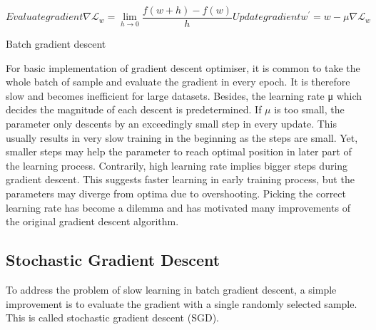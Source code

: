 \documentclass[11pt]{article} %
\theoremstyle{plain}
\theoremstyle{definition}
\begin{document}
\begin{appendices}
	\begin{subequations} 
		
		Evaluate gradient
		\begin{equation}
		\label{bgd1}
		\nabla\mathcal{L}_w=\lim\limits_{h\rightarrow 0}\frac{f(w+h)-f(w)}{h}
		\end{equation}
		
		Update gradient
		\begin{equation}
		\label{bgd2}
		w^\prime=w-\mu\nabla\mathcal{L}_w
		\end{equation}
		
	\end{subequations}
	
	\begin{algorithm}[H]
		\caption{Batch gradient descent}
		\label{bgd}
		
		
	\end{algorithm}
	
	For basic implementation of gradient descent optimiser, it is common to take the whole batch of sample and evaluate the gradient in every epoch. It is therefore slow and becomes inefficient for large datasets. Besides, the learning rate μ which decides the magnitude of each descent is predetermined. If \(\mu\) is too small, the parameter only descents by an exceedingly small step in every update. This usually results in very slow training in the beginning as the steps are small. Yet, smaller steps may help the parameter to reach optimal position in later part of the learning process. Contrarily, high learning rate implies bigger steps during gradient descent. This suggests faster learning in early training process, but the parameters may diverge from optima due to overshooting. Picking the correct learning rate has become a dilemma and has motivated many improvements of the original gradient descent algorithm.
	
	\subsection{Stochastic Gradient Descent}
	
	To address the problem of slow learning in batch gradient descent, a simple improvement is to evaluate the gradient with a single randomly selected sample. This is called stochastic gradient descent (SGD). 
	

\end{appendices}
\end{document}
